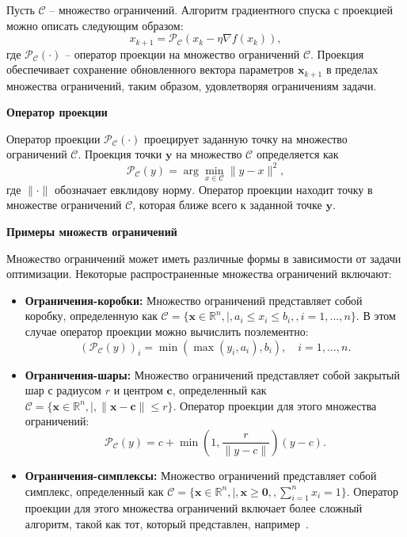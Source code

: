Пусть $\mathcal{C}$ -- множество ограничений.
Алгоритм градиентного спуска с проекцией
можно описать следующим образом:
\[ x_{k+1} = \mathcal{P}_{\mathcal{C}}(x_k - \eta \nabla f(x_k)), \]
где $\mathcal{P}_{\mathcal{C}}(\cdot)$ -- оператор проекции
на множество ограничений $\mathcal{C}$.
Проекция обеспечивает сохранение обновленного
вектора параметров $\mathbf{x}_{k+1}$ в пределах множества
ограничений, таким образом, удовлетворяя ограничениям задачи.

\textbf{Оператор проекции}

Оператор проекции $\mathcal{P}_{\mathcal{C}}(\cdot)$
проецирует заданную точку на множество ограничений $\mathcal{C}$.
Проекция точки $\mathbf{y}$ на множество $\mathcal{C}$ определяется как
\[
    \mathcal{P}_{\mathcal{C}}(y) =
    \arg \min_{x \in \mathcal{C}} \|y - x\|^2,
\]
где $\|\cdot\|$ обозначает евклидову норму.
Оператор проекции находит точку в множестве ограничений
$\mathcal{C}$, которая ближе всего к заданной точке $\mathbf{y}$.

\textbf{Примеры множеств ограничений}

Множество ограничений может иметь различные формы
в зависимости от задачи оптимизации.
Некоторые распространенные множества ограничений включают:
\begin{itemize}
    \item \textbf{Ограничения-коробки:} Множество ограничений представляет
    собой коробку, определенную как
    $\mathcal{C} = \{\mathbf{x} \in \mathbb{R}^n , | , a_i
    \leq x_i \leq b_i, , i=1,\dots,n\}$.
    В этом случае оператор проекции можно вычислить поэлементно:
    \[
        (\mathcal{P}_{\mathcal{C}}(y))_i =
        \min(\max(y_i, a_i), b_i), \quad i=1,\dots,n.
    \]

    \item \textbf{Ограничения-шары:} Множество ограничений представляет
    собой закрытый шар с радиусом $r$ и центром $\mathbf{c}$,
    определенный как $\mathcal{C} = \{\mathbf{x} \in \mathbb{R}^n , | ,
    \|\mathbf{x} - \mathbf{c}\| \leq r\}$.
    Оператор проекции для этого множества ограничений:
    \[
        \mathcal{P}_{\mathcal{C}}(y) = c
        + \min\left(1, \frac{r}{\|y-c\|}\right)(y-c).
    \]
    \item \textbf{Ограничения-симплексы:} Множество ограничений
    представляет собой симплекс, определенный как
    $\mathcal{C} = \{\mathbf{x} \in \mathbb{R}^n ,
    | , \mathbf{x} \geq \mathbf{0}, , \sum_{i=1}^n x_i = 1\}$.
    Оператор проекции для этого множества ограничений включает
    более сложный алгоритм, такой как тот,
    который представлен, например~\cite{Duchi2011}.
\end{itemize}

